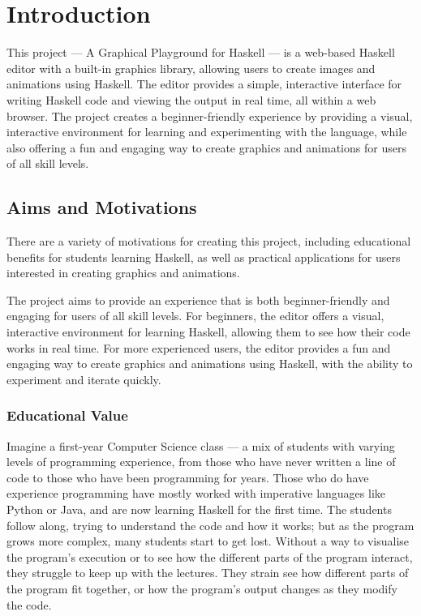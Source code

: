 \documentclass[../main.tex]{subfiles}
\begin{document}
\chapter{Introduction} \label{ch:introduction}
    This project — A Graphical Playground for Haskell — is a web-based Haskell
        editor with a built-in graphics library, allowing users to create images and
        animations using Haskell.
    The editor provides a simple, interactive interface for writing Haskell code
        and viewing the output in real time, all within a web browser.
    The project creates a beginner-friendly experience by providing a visual,
        interactive environment for learning and experimenting with the language, while
        also offering a fun and engaging way to create graphics and animations for
        users of all skill levels.

    \section{Aims and Motivations}
        There are a variety of motivations for creating this project, including
            educational benefits for students learning Haskell, as well as practical
            applications for users interested in creating graphics and animations.

        The project aims to provide an experience that is both beginner-friendly and
            engaging for users of all skill levels.
        For beginners, the editor offers a visual, interactive environment for learning
            Haskell, allowing them to see how their code works in real time.
        For more experienced users, the editor provides a fun and engaging way to
            create graphics and animations using Haskell, with the ability to experiment
            and iterate quickly.

        \subsection{Educational Value}
            Imagine a first-year Computer Science class — a mix of students with varying
                levels of programming experience, from those who have never written a line of
                code to those who have been programming for years.
            Those who do have experience programming have mostly worked with imperative
                languages like Python or Java, and are now learning Haskell for the first time.
            The students follow along, trying to understand the code and how it works; but
                as the program grows more complex, many students start to get lost.
            Without a way to visualise the program's execution or to see how the different
                parts of the program interact, they struggle to keep up with the lectures.
            They strain see how different parts of the program fit together, or how the
                program's output changes as they modify the code.
\end{document}
